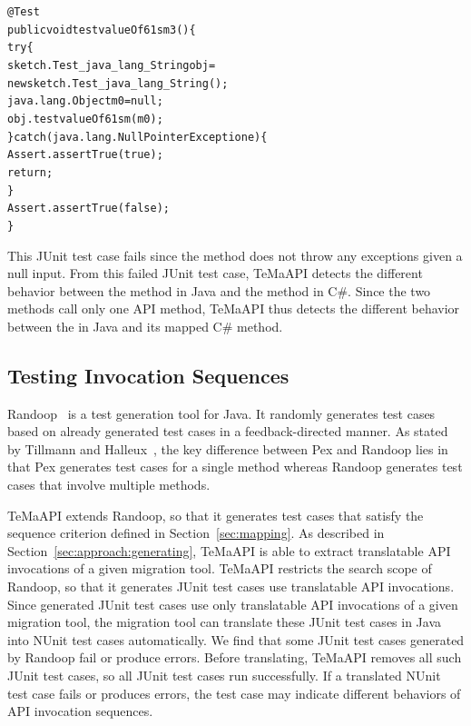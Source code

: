 \begin{CodeOut}%
\begin{alltt}
 @Test
 public void testvalueOf61sm3()\{
   try\{
     sketch.Test_java_lang_String obj =
           new sketch.Test_java_lang_String();
     java.lang.Object m0 = null;
     obj.testvalueOf61sm(m0);
   \}catch(java.lang.NullPointerException e)\{
     Assert.assertTrue(true);
     return;
   \}
   Assert.assertTrue(false);
 \}
\end{alltt}
\end{CodeOut}

This JUnit test case fails since the  method does not throw any exceptions given a null input.
From this failed JUnit test case, TeMaAPI detects the different behavior between the  method in Java and the  method in C\#. Since the two methods call only one API method, TeMaAPI thus detects the different behavior between the  in Java and its mapped C\# method.

\subsection{Testing Invocation Sequences}
\label{sec:approach:sequence}
Randoop~\cite{pacheco2007feedback} is a test generation tool for Java. It randomly generates test cases based on already generated test cases in a feedback-directed manner. As stated by Tillmann and Halleux~\cite{tillmann2008pex}, the key difference between Pex and Randoop lies in that Pex generates test cases for a single method whereas Randoop generates test cases that involve multiple methods.

TeMaAPI extends Randoop, so that it generates test cases that satisfy the sequence criterion defined in Section~\ref{sec:mapping}. As described in Section~\ref{sec:approach:generating}, TeMaAPI is able to extract translatable API invocations of a given migration tool. TeMaAPI restricts the search scope of Randoop, so that it generates JUnit test cases use translatable API invocations. Since generated JUnit test cases use only translatable API invocations of a given migration tool, the migration tool can translate these JUnit test cases in Java into NUnit test cases automatically. We find that some JUnit test cases generated by Randoop fail or produce errors. Before translating, TeMaAPI removes all such JUnit test cases, so all JUnit test cases run successfully. If a translated NUnit test case fails or produces errors, the test case may indicate different behaviors of API invocation sequences.

